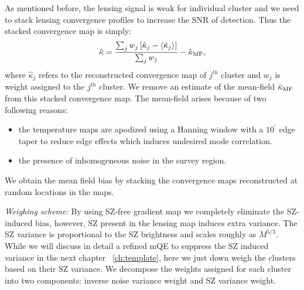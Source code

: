 As mentioned before, the lensing signal is weak for individual cluster and we need to stack lensing convergence profiles to increase the SNR of detection.
 Thus the stacked convergence map is simply: 
 \begin{equation}
 \hat{\kappa} = \frac{\sum_j  w_j \left[ \hat{\kappa}_{j} - \left< \hat{\kappa}_{j} \right> \right]}{\sum_j w_j} - \hat{\kappa}_{\rm MF},
 \end{equation}
 where $\hat{\kappa}_{j}$ refers to the reconstructed convergence map of $j^{th}$ cluster %
 and  $w_{j}$ is weight assigned to the $j^{th}$ cluster.
We remove an estimate of the mean-field $\hat{\kappa}_{\rm MF}$ from this stacked convergence map.
The mean-field arises because of two following reasons:
\begin{itemize}
\item  the temperature maps are apodized using a Hanning window with a $10^{\prime}$ edge taper to reduce edge effects which induces undesired mode correlation.
\item the presence of inhomogeneous noise in the survey region.
\end{itemize}
We obtain the mean field bias by stacking the convergence maps reconstructed at \howmanyrandomsforMF{} random locations in the maps. 


{\it Weighing scheme:} By using SZ-free gradient map we completely eliminate the SZ-induced bias, however, SZ present in the lensing map induces extra variance.
The SZ variance is proportional to the SZ brightness and scales roughly as $M^{5/3}$.
While we will discuss in detail a refined mQE to suppress the SZ induced variance in the next chapter ~\ref{ch:template}, here we just down weigh the clusters based on their SZ variance.
We decompose the weights assigned for each cluster into two components: inverse noise variance weight and SZ variance weight. 
 
